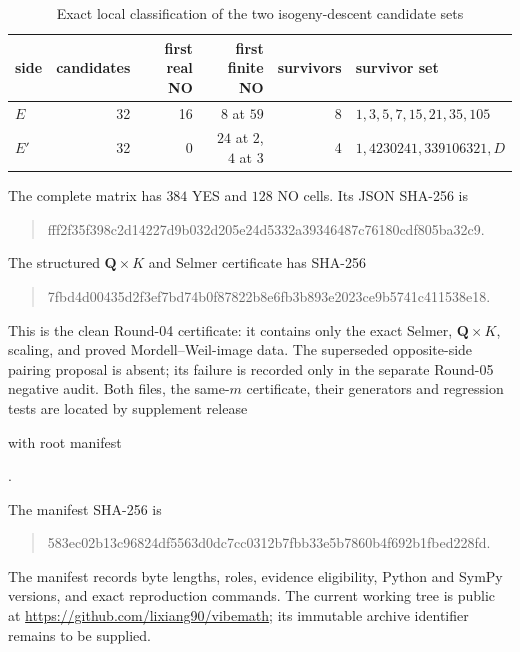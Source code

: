 \documentclass[11pt]{article}
\newcommand{\Q}{\mathbf Q}
\begin{document}
\begin{table}[ht]
\centering
\caption{Exact local classification of the two isogeny-descent candidate sets}
\label{tab:local-classification}
\begin{tabular}{lrrrrl}
\toprule
side & candidates & first real NO & first finite NO & survivors & survivor set\\
\midrule
$E$ & 32 & 16 & $8$ at $59$ & 8 & $1,3,5,7,15,21,35,105$\\
$E'$& 32 & 0 & $24$ at $2$, $4$ at $3$ & 4 & $1,4230241,339106321,D$\\
\bottomrule
\end{tabular}
\end{table}
The complete matrix has $384$ YES and $128$ NO cells.  Its JSON SHA-256 is
\begin{quote}\small\ttfamily
fff2f35f398c2d14227d9b032d205e24d5332a39346487c76180cdf805ba32c9.
\end{quote}
The structured $\Q\times K$ and Selmer certificate has SHA-256
\begin{quote}\small\ttfamily
7fbd4d00435d2f3ef7bd74b0f87822b8e6fb3b893e2023ce9b5741c411538e18.
\end{quote}
This is the clean Round-04 certificate: it contains only the exact Selmer,
$\Q\times K$, scaling, and proved Mordell--Weil-image data.  The superseded
opposite-side pairing proposal is absent; its failure is recorded only in the
separate Round-05 negative audit.
Both files, the same-$m$ certificate, their generators and regression tests
are located by supplement release
\begin{center}
\end{center}
with root manifest
\begin{center}
.
\end{center}
The manifest SHA-256 is
\begin{quote}\small\ttfamily
583ec02b13c96824df5563d0dc7cc0312b7fbb33e5b7860b4f692b1fbed228fd.
\end{quote}
The manifest records byte lengths, roles, evidence eligibility, Python and
SymPy versions, and exact reproduction commands.  The current working tree is
public at \url{https://github.com/lixiang90/vibemath}; its immutable archive
identifier remains to be supplied.
\end{document}

